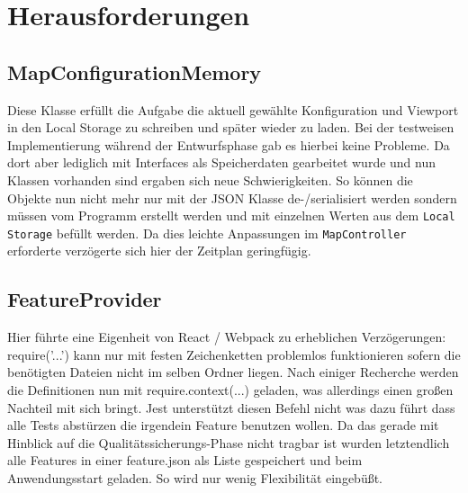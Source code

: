 \section{Herausforderungen}

\subsection{MapConfigurationMemory}

Diese Klasse erfüllt die Aufgabe die aktuell gewählte Konfiguration und Viewport in den 
Local Storage zu schreiben und später wieder zu laden. Bei der testweisen Implementierung während
der Entwurfsphase gab es hierbei keine Probleme. Da dort aber lediglich mit Interfaces als Speicherdaten
gearbeitet wurde und nun Klassen vorhanden sind ergaben sich neue Schwierigkeiten.
So können die Objekte nun nicht mehr nur mit der JSON Klasse de-/serialisiert werden sondern müssen
vom Programm erstellt werden und mit einzelnen Werten aus dem \texttt{Local Storage} befüllt werden.
Da dies leichte Anpassungen im \texttt{MapController} erforderte verzögerte sich hier der Zeitplan 
geringfügig.

\subsection{FeatureProvider}

Hier führte eine Eigenheit von React / Webpack zu erheblichen Verzögerungen: 
require('...') kann nur mit festen Zeichenketten problemlos funktionieren sofern die benötigten
Dateien nicht im selben Ordner liegen. Nach einiger Recherche werden die Definitionen nun mit 
require.context(...) geladen, was allerdings einen großen Nachteil mit sich bringt.
Jest unterstützt diesen Befehl nicht was dazu führt dass alle Tests abstürzen die irgendein Feature
benutzen wollen.
Da das gerade mit Hinblick auf die Qualitätssicherungs-Phase nicht tragbar ist wurden letztendlich
alle Features in einer feature.json als Liste gespeichert und beim Anwendungsstart geladen.
So wird nur wenig Flexibilität eingebüßt.